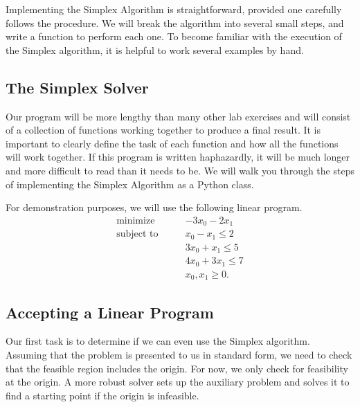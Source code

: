 


Implementing the Simplex Algorithm is straightforward, provided one carefully follows the procedure.
We will break the algorithm into several small steps, and write a function to perform each one.
To become familiar with the execution of the Simplex algorithm, it is helpful to work several examples by hand.

\subsection*{The Simplex Solver} %

Our program will be more lengthy than many other lab exercises and will consist of a collection of functions working together to produce a final result.
It is important to clearly define the task of each function and how all the functions will work together.
If this program is written haphazardly, it will be much longer and more difficult to read than it needs to be.
We will walk you through the steps of implementing the Simplex Algorithm as a Python class.

For demonstration purposes, we will use the following linear program.
\begin{align*}
\text{minimize}\qquad & -3x_0 - 2x_1 \\
\text{subject to}\qquad
& x_0 - x_1 \leq 2 \\
& 3x_0 + x_1 \leq 5 \\
& 4x_0 + 3x_1 \leq 7 \\
& x_0, x_1 \geq 0.
\end{align*}

\subsection*{Accepting a Linear Program} %

Our first task is to determine if we can even use the Simplex algorithm.
Assuming that the problem is presented to us in standard form, we need to check that the feasible region includes the origin.  For now, we only check for feasibility at the origin. A more robust solver sets up the auxiliary problem and solves it to find a starting point if the origin is infeasible.

